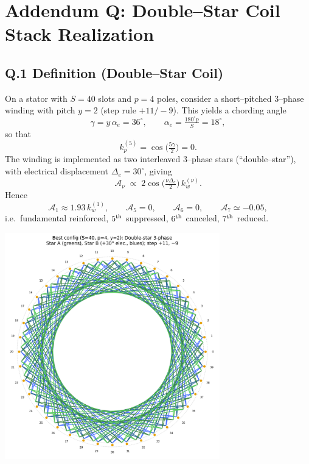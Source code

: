 \documentclass[11pt,a4paper]{article}
\begin{document}
\section*{Addendum Q: Double--Star Coil Stack Realization}
\label{sec:addendumQ}

\subsection*{Q.1 Definition (Double--Star Coil)}
On a stator with $S=40$ slots and $p=4$ poles, consider a short--pitched
3--phase winding with pitch $y=2$ (step rule $+11/−9$).
This yields a chording angle
\[
	\gamma = y\,\alpha_e = 36^\circ,
	\qquad
	\alpha_e = \tfrac{180^\circ p}{S} = 18^\circ,
\]
so that
\[
	k_p^{(5)}=\cos\!\big(\tfrac{5\gamma}{2}\big)=0.
\]
The winding is implemented as two interleaved 3--phase stars (``double--star''),
with electrical displacement $\Delta_e=30^\circ$, giving
\[
	\mathcal A_\nu \;\propto\; 2\cos\!\Big(\tfrac{\nu\Delta_e}{2}\Big)\,k_w^{(\nu)}.
\]
Hence
\[
	\mathcal A_1 \approx 1.93\,k_w^{(1)},\qquad
	\mathcal A_5=0,\qquad
	\mathcal A_6=0,\qquad
	\mathcal A_7\simeq -0.05,
\]
i.e.\ fundamental reinforced, $5^{\rm th}$ suppressed, $6^{\rm th}$ canceled,
$7^{\rm th}$ reduced.

\begin{center}
    \includegraphics[width=0.7\textwidth]{S40_double_star_best}
\end{center}
\end{document}
